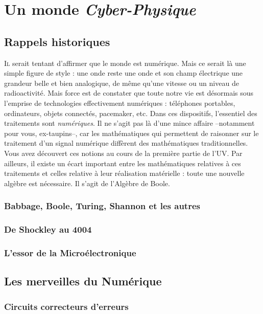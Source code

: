 \chapter{Un monde {\it Cyber-Physique}}
\minitoc

\section{Rappels historiques}
\lettrine{I}l serait tentant d'affirmer que le monde est numérique. Mais ce serait là une simple
figure de style : une onde reste une onde et son champ électrique une grandeur belle et bien analogique, de même qu'une vitesse ou
un niveau de radioactivité. Mais force est de constater que toute notre vie est désormais sous l'emprise
de technologies effectivement numériques : téléphones portables, ordinateurs, objets connectés, pacemaker, etc. Dans ces dispositifs,
l'essentiel des traitements sont {\it numériques}. Il ne s'agit pas là d'une mince affaire --notamment pour vous, ex-taupins--, car
les mathématiques qui permettent de raisonner sur le traitement d'un signal numérique diffèrent des mathématiques traditionnelles. Vous avez découvert ces notions au cours de la première partie de l'UV. Par ailleurs, il existe un écart important entre les mathématiques relatives à ces traitements et celles relative à leur réalisation matérielle : toute une nouvelle
algèbre est nécessaire. Il s'agit de l'Algèbre de Boole.


\subsection{Babbage, Boole, Turing, Shannon et les autres}
\subsection{De Shockley au 4004}
\subsection{L'essor de la Microélectronique}

\section{Les merveilles du Numérique}

\subsection{Circuits correcteurs d'erreurs}

